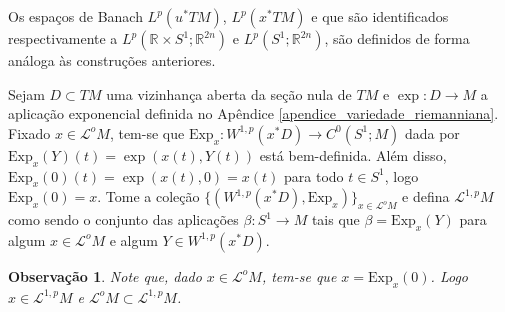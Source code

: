 \documentclass[12pt]{book}
\newtheorem{observacao}[teorema]{Observação}
\newcommand{\caminhosexponenciaisSobolev}{\mathcal{L}^{1,p}M}
\newcommand{\circulo}{S^{1}}
\newcommand{\espacoLp}[1]{L^{p}(#1)}
\newcommand{\espacoLpcontradominio}[2]{L^{p}(#1;#2)}
\newcommand{\espacosobolev}[1]{W^{1,p}(#1)}
\newcommand{\Exp}{\text{Exp}}
\newcommand{\pullbackfibradotangente}[2]{#1^{*}T#2}
\newcommand{\pullbackfibradotangenteM}[1]{\pullbackfibradotangente{#1}{M}}
\newcommand{\retacartesianocirculo}{\real{} \times \circulo}
\newcommand{\real}[1]{\mathbb{R}^{#1}}
\newcommand{\lacocontrateis}{\mathcal{L}^{o}M}
\begin{document}
	Os espaços de Banach  $\espacoLp{\pullbackfibradotangenteM{u}}$, $\espacoLp{\pullbackfibradotangenteM{x}}$ e que são identificados respectivamente a $\espacoLpcontradominio{\retacartesianocirculo}{\real{2n}}$ e $\espacoLpcontradominio{\circulo}{\real{2n}}$, são definidos de forma análoga às construções anteriores.
	
	Sejam $D \subset TM$ uma vizinhança aberta da seção nula de $TM$ e $\exp:D\to M$ a aplicação exponencial definida no Apêndice \ref{apendice_variedade_riemanniana}.
	Fixado $x\in \lacocontrateis$, tem-se que $\Exp_{x}: \espacosobolev{x^{*}D} \to C^{0}(\circulo;M)$ dada por $\Exp_{x}(Y)(t) = \exp(x(t),Y(t))$ está bem-definida. Além disso, $\Exp_{x}(0)(t) = \exp(x(t),0) = x(t)$ para todo $t\in \circulo$, logo $\Exp_{x}(0)=x$.
	Tome a coleção $\{ (\espacosobolev{x^{*}D}, \Exp_{x}) \}_{x \in \lacocontrateis}$ e defina $\caminhosexponenciaisSobolev$ como sendo o conjunto das aplicações $\beta:\circulo\to M$ tais que $\beta=\Exp_{x}(Y)$ para algum $x\in \lacocontrateis$ e algum $Y \in \espacosobolev{x^{*}D}$.
	
	\begin{observacao}\label{observacao_inclusao_lacoescontrateis}
		Note que, dado $x\in \lacocontrateis$, tem-se que $x=\Exp_{x}(0)$. Logo $x\in \caminhosexponenciaisSobolev$ e $\lacocontrateis \subset \caminhosexponenciaisSobolev$.
	\end{observacao}
	
\end{document}
